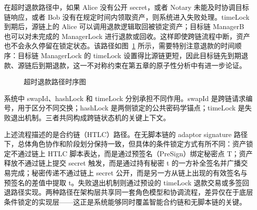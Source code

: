 在超时退款路径中，如果 Alice 没有公开 secret，或者 Notary 未能及时协调目标链响应，或者 Bob 没有在规定时间内领取资产，则系统进入失败处理。timeLock 到期后，源链上的 Alice 可以调用退款逻辑取回被锁定资产；目标链 ManagerB 也可以对未完成的 ManagerLock 进行退款或回收。这样即使跨链流程中断，资产也不会永久停留在锁定状态。该路径如图~\ref{fig:crosschain_seq_refund} 所示，需要特别注意退款的时间顺序：目标链 ManagerLock 的 timeLock 设置得比源链更短，因此目标链先到期退款、源链后到期退款，这一不对称约束在第五章的原子性分析中有进一步论证。

\begin{figure}[htbp]
  \centering
  
  \caption{超时退款路径时序图}
  \label{fig:crosschain_seq_refund}
\end{figure}


系统中 swapId、hashLock 和 timeLock 分别承担不同作用。swapId 是跨链请求编号，用于区分不同交换；hashLock 是两侧锁定的公共密码学锚点；timeLock 是失败退出机制。三者共同构成跨链状态机的关键上下文。


上述流程描述的是合约链（HTLC）路径。在无脚本链的 adaptor signature 路径下，总体角色协作和阶段划分保持一致，但具体的条件锁定方式有所不同：资产锁定不通过链上 HTLC 脚本表达，而是通过预签名（PreSign）绑定秘密点 T；资产释放不通过链上提交 secret 触发，而是通过持有秘密 t 的一方补全签名并广播交易完成；秘密传递不通过链上 secret 公开，而是另一方从链上出现的有效签名与预签名的差值中提取 t。失败退出机制则通过预设的 timeLock 退款交易或多签回退路径实现。两种路径在架构层共享同一套角色模型和协调流程，差异仅在于底层条件锁定的实现层——这正是系统能够同时覆盖智能合约链和无脚本链的关键。
